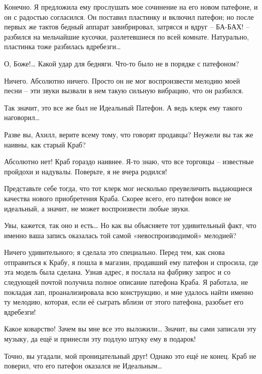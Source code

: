 \documentclass[../main.tex]{subfiles}
\begin{document}
\begin{Dialogue}
 Конечно. Я предложила ему прослушать мое сочинение на его новом патефоне, и он с радостью согласился. Он поставил пластинку и включил патефон; но после первых же тактов бедный аппарат завибрировал, затрясся и вдруг \--- БА-БАХ! \--- разбился на мельчайшие кусочки, разлетевшиеся по всей комнате. Натурально, пластинка тоже разбилась вдребезги\ldots{}

 О, Боже!\ldots{} Какой удар для бедняги. Что-то было не в порядке с патефоном?

 Ничего. Абсолютно ничего. Просто он не мог воспроизвести мелодию моей песни \--- эти звуки вызвали в нем такую сильную вибрацию, что он разбился.

 Так значит, это все же был не Идеальный Патефон. А ведь клерк ему такого наговорил\ldots{}

 Разве вы, Ахилл, верите всему тому, что говорят продавцы? Неужели вы так же наивны, как старый Краб?

 Абсолютно нет! Краб гораздо наивнее. Я-то знаю, что все торговцы \--- известные пройдохи и надувалы. Поверьте, я не вчера родился!

 Представьте себе тогда, что тот клерк мог несколько преувеличить выдающиеся качества нового приобретения Краба. Скорее всего, его патефон вовсе не идеальный, а значит, не может воспроизвести любые звуки.

 Увы, кажется, так оно и есть\ldots{} Но как вы объясняете тот удивительный факт, что именно ваша запись оказалась той самой «невоспроизводимой» мелодией?

 Ничего удивительного; я сделала это специально. Перед тем, как снова отправиться к Крабу, я пошла в магазин, продавший ему патефон и спросила, где эта модель была сделана. Узнав адрес, я послала на фабрику запрос и со следующей почтой получила полное описание патефона Краба. Я работала, не покладая лап, проанализировала всю конструкцию, и мне удалось найти именно ту мелодию, которая, если её сыграть вблизи от этого патефона, разобьет его вдребезги!

 Какое коварство! Зачем вы мне все это выложили\ldots{} Значит, вы сами записали эту музыку, да ещё и принесли эту подлую штуку ему в подарок!

 Точно, вы угадали, мой проницательный друг! Однако это ещё не конец. Краб не поверил, что его патефон оказался не Идеальным\ldots{}


\end{Dialogue}
\end{document}

